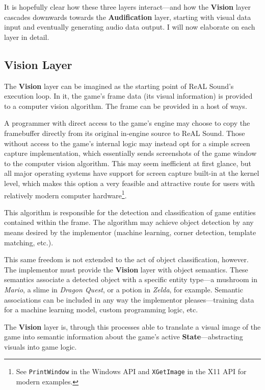 \documentclass{report}
\newcommand{\rs}{ReAL Sound\xspace}
\newcommand{\state}[1]{\textbf{#1}}
\newcommand{\vision}{\textbf{Vision}\xspace}
\newcommand{\audio}{\textbf{Audification}\xspace}
\begin{document}
It is hopefully clear how these three layers interact---and how the \vision layer cascades downwards towards the \audio layer, starting with visual data input and eventually generating audio data output. I will now elaborate on each layer in detail. 

\subsection{Vision Layer}

The \vision layer can be imagined as the starting point of \rs's execution loop. In it, the game's frame data (its visual information) is provided to a computer vision algorithm. The frame can be provided in a host of ways. 

A programmer with direct access to the game's engine may choose to copy the framebuffer directly from its original in-engine source to \rs. Those without access to the game's internal logic may instead opt for a simple screen capture implementation, which essentially sends screenshots of the game window to the computer vision algorithm. This may seem inefficient at first glance, but all major operating systems have support for screen capture built-in at the kernel level, which makes this option a very feasible and attractive route for users with relatively modern computer hardware\footnote{See \texttt{PrintWindow} in the Windows API \cite{PrintWindow} and \texttt{XGetImage} in the X11 API \cite{XGetWindow} for modern examples.}. 

This algorithm is responsible for the detection and classification of game entities contained within the frame. The algorithm may achieve object detection by any means desired by the implementor (machine learning, corner detection, template matching, etc.). 

This same freedom is not extended to the act of object classification, however. The implementor must provide the \vision layer with object semantics. These semantics associate a detected object with a specific entity type---a mushroom in \emph{Mario}, a slime in \emph{Dragon Quest}, or a potion in \emph{Zelda}, for example. Semantic associations can be included in any way the implementor pleases---training data for a machine learning model, custom programming logic, etc. 

The \vision layer is, through this processes able to translate a visual image of the game into semantic information about the game's active \state{State}---abstracting visuals into game logic. 
\end{document}
